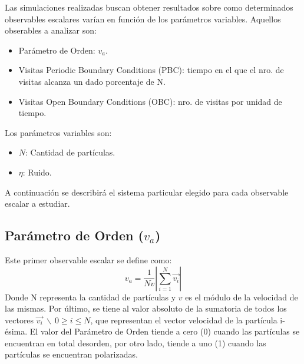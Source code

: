 \documentclass[11pt]{article}
\begin{document}
        Las simulaciones realizadas buscan obtener resultados sobre como determinados observables escalares varían
        en función de los parámetros variables. Aquellos obserables a analizar son:
        \begin{itemize}
            \item Parámetro de Orden: $v_a$.
            \item Visitas Periodic Boundary Conditions (PBC): tiempo en el que el nro. de visitas alcanza un dado porcentaje de N.
            \item Visitas Open Boundary Conditions (OBC): nro. de visitas por unidad de tiempo.
        \end{itemize}
        Los parámetros variables son:
        \begin{itemize}
            \item $N$: Cantidad de partículas.
            \item $\eta$: Ruido.
        \end{itemize}

        A continuación se describirá el sistema particular elegido para cada observable escalar a estudiar.

        \subsection{Parámetro de Orden ($v_a$)}
            Este primer observable escalar se define como:
            \begin{equation}
                v_a = \frac{1}{Nv} \left|\sum_{i=1}^{N} \vec{v_i} \right|
            \end{equation}
            Donde N representa la cantidad de partículas y $v$ es el módulo de la velocidad de las mismas. Por último,
            se tiene al valor absoluto de la sumatoria de todos los vectores $\vec{v_i} \  \backslash \  0 \geq i \leq N$,
            que representan el vector velocidad de la partícula i-ésima. El valor del Parámetro de Orden tiende a cero
            (0) cuando las partículas se encuentran en total desorden, por otro lado, tiende a uno (1) cuando las partículas
            se encuentran polarizadas.
\end{document}
